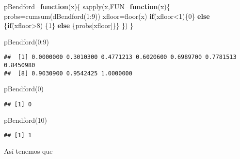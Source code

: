 \documentclass[
]{article}
\newenvironment{Shaded}{\begin{snugshade}}{\end{snugshade}}
\newcommand{\AttributeTok}[1]{\textcolor[rgb]{0.77,0.63,0.00}{#1}}
\newcommand{\ControlFlowTok}[1]{\textcolor[rgb]{0.13,0.29,0.53}{\textbf{#1}}}
\newcommand{\DecValTok}[1]{\textcolor[rgb]{0.00,0.00,0.81}{#1}}
\newcommand{\FunctionTok}[1]{\textcolor[rgb]{0.00,0.00,0.00}{#1}}
\newcommand{\NormalTok}[1]{#1}
\newcommand{\OtherTok}[1]{\textcolor[rgb]{0.56,0.35,0.01}{#1}}
\newcommand{\SpecialCharTok}[1]{\textcolor[rgb]{0.00,0.00,0.00}{#1}}
\begin{document}
\begin{Shaded}
\begin{Highlighting}[]
\NormalTok{pBendford}\OtherTok{=}\ControlFlowTok{function}\NormalTok{(x)\{}
  \FunctionTok{sapply}\NormalTok{(x,}\AttributeTok{FUN=}\ControlFlowTok{function}\NormalTok{(x)\{}
\NormalTok{  probs}\OtherTok{=}\FunctionTok{cumsum}\NormalTok{(}\FunctionTok{dBendford}\NormalTok{(}\DecValTok{1}\SpecialCharTok{:}\DecValTok{9}\NormalTok{))}
\NormalTok{  xfloor}\OtherTok{=}\FunctionTok{floor}\NormalTok{(x)}
  \ControlFlowTok{if}\NormalTok{(xfloor}\SpecialCharTok{\textless{}}\DecValTok{1}\NormalTok{)\{}\DecValTok{0}\NormalTok{\} }\ControlFlowTok{else}\NormalTok{ \{}\ControlFlowTok{if}\NormalTok{(xfloor}\SpecialCharTok{\textgreater{}}\DecValTok{8}\NormalTok{) \{}\DecValTok{1}\NormalTok{\} }\ControlFlowTok{else}\NormalTok{ \{probs[xfloor]\}\}}
\NormalTok{\})}
\NormalTok{\}}

\FunctionTok{pBendford}\NormalTok{(}\DecValTok{0}\SpecialCharTok{:}\DecValTok{9}\NormalTok{)}
\end{Highlighting}
\end{Shaded}

\begin{verbatim}
##  [1] 0.0000000 0.3010300 0.4771213 0.6020600 0.6989700 0.7781513 0.8450980
##  [8] 0.9030900 0.9542425 1.0000000
\end{verbatim}

\begin{Shaded}
\begin{Highlighting}[]
\FunctionTok{pBendford}\NormalTok{(}\DecValTok{0}\NormalTok{)}
\end{Highlighting}
\end{Shaded}

\begin{verbatim}
## [1] 0
\end{verbatim}

\begin{Shaded}
\begin{Highlighting}[]
\FunctionTok{pBendford}\NormalTok{(}\DecValTok{10}\NormalTok{)}
\end{Highlighting}
\end{Shaded}

\begin{verbatim}
## [1] 1
\end{verbatim}

Así tenemos que
\end{document}

